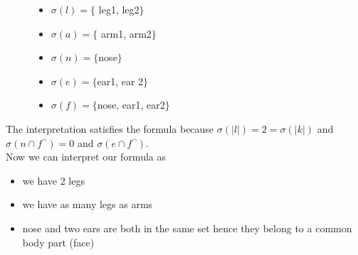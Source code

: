 \documentclass{book}
\theoremstyle{break}
\theoremstyle{definition}
\begin{document}
\begin{figure}[H]
\begin{minipage}[t]{0.5\textwidth}
\raggedright
\begin{itemize}
\item $\sigma(l)=\{$ leg1, leg2$\}$
\item $\sigma(a)=\{$ arm1, arm2$\}$
\end{itemize}
\end{minipage}%
\begin{minipage}[t]{0.5\textwidth}
\raggedright
\begin{itemize}
\item $\sigma(n)=\{$nose$\}$
\item $\sigma(e)=\{$ear1, ear 2$\}$
\item $\sigma(f)=\{$nose, ear1, ear2$\}$
\end{itemize}
\end{minipage}
\end{figure}
The interpretation satisfies the formula because $\sigma(|l|)=2=\sigma(|k|)$ and $\sigma(n\cap f^\neg)=0$ and $\sigma(e\cap f^\neg)$.\\
Now we can interpret our formula as 
\begin{itemize}
\item we have 2 legs
\item we have as many legs as arms
\item nose and two ears are both in the same set hence they belong to a common body part (face)
\end{itemize}
\end{document}
